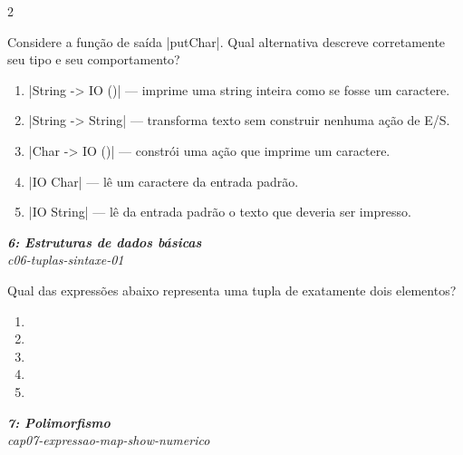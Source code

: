 \documentclass[a4paper,10pt,brazil]{article}
\begin{document}
\begin{multicols}{2}
\begin{flushright}
\end{flushright}
Considere a função de saída \haskellinline|putChar|. Qual alternativa descreve corretamente seu tipo e seu comportamento?

\begin{enumerate}
  \item \haskellinline|String -> IO ()| — imprime uma string inteira como se fosse um caractere.

  \item \haskellinline|String -> String| — transforma texto sem construir nenhuma ação de E/S.

  \item \haskellinline|Char -> IO ()| — constrói uma ação que imprime um caractere.

  \item \haskellinline|IO Char| — lê um caractere da entrada padrão.

  \item \haskellinline|IO String| — lê da entrada padrão o texto que deveria ser impresso.


\end{enumerate}

\begin{flushright}
  \footnotesize
  \textit{\textbf{6: Estruturas de dados básicas}}\\
  \textit{c06-tuplas-sintaxe-01}\\

\end{flushright}
Qual das expressões abaixo representa uma tupla de exatamente dois elementos?

\begin{enumerate}
  \item {}

  \item {}

  \item {}

  \item {}

  \item \haskellinline{[42, "ok"]}


\end{enumerate}

\begin{flushright}
  \footnotesize
  \textit{\textbf{7: Polimorfismo}}\\
  \textit{cap07-expressao-map-show-numerico}\\


\end{flushright}
\end{multicols}
\end{document}

